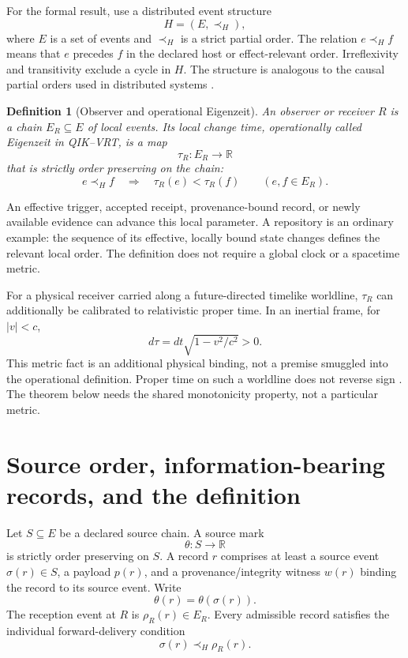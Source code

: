 \documentclass[11pt]{article}
\newtheorem{definition}{Definition}[section]
\theoremstyle{remark}
\newcommand{\host}{\prec_{\!H}}
\newcommand{\qikvrt}{QIK--VRT}
\begin{document}
For the formal result, use a distributed event structure
\[
  H=(E,\host),
\]
where $E$ is a set of events and $\host$ is a strict partial order.  The
relation $e\host f$ means that $e$ precedes $f$ in the declared host or
effect-relevant order.  Irreflexivity and transitivity exclude a cycle in
$H$.  The structure is analogous to the causal partial orders used in
distributed systems \cite{Lamport1978}.

\begin{definition}[Observer and operational Eigenzeit]
\label{def:eigenzeit}
An observer or receiver $R$ is a chain $E_R\subseteq E$ of local events.  Its
local change time, operationally called \emph{Eigenzeit} in \qikvrt{}, is a
map
\[
  \tau_R:E_R\longrightarrow\mathbb{R}
\]
that is strictly order preserving on the chain:
\[
  e\host f\quad\Longrightarrow\quad \tau_R(e)<\tau_R(f)
  \qquad (e,f\in E_R).
\]
\end{definition}

An effective trigger, accepted receipt, provenance-bound record, or newly
available evidence can advance this local parameter.  A repository is an
ordinary example: the sequence of its effective, locally bound state changes
defines the relevant local order.  The definition does not require a global
clock or a spacetime metric.

For a physical receiver carried along a future-directed timelike worldline,
$\tau_R$ can additionally be calibrated to relativistic proper time.  In an
inertial frame, for $|v|<c$,
\[
  d\tau=dt\sqrt{1-v^2/c^2}>0.
\]
This metric fact is an additional physical binding, not a premise smuggled
into the operational definition.  Proper time on such a worldline does not
reverse sign \cite{Einstein1905,Minkowski1909}.  The theorem below needs the
shared monotonicity property, not a particular metric.

\section{Source order, information-bearing records, and the definition}
\label{sec:definition}

Let $S\subseteq E$ be a declared source chain.  A source mark
\[
  \theta:S\longrightarrow\mathbb{R}
\]
is strictly order preserving on $S$.  A record $r$ comprises at least a
source event $\sigma(r)\in S$, a payload $p(r)$, and a provenance/integrity
witness $w(r)$ binding the record to its source event.  Write
\[
  \theta(r)=\theta(\sigma(r)).
\]
The reception event at $R$ is $\rho_R(r)\in E_R$.  Every admissible record
satisfies the individual forward-delivery condition
\begin{equation}
  \sigma(r)\host\rho_R(r).
  \label{eq:forward}
\end{equation}
\end{document}
